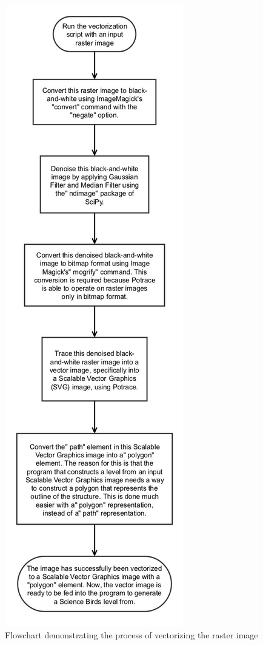 \documentclass{dalthesis}
\begin{document}
\begin{figure}[H]
  \centering
	\caption{Flowchart demonstrating the process of vectorizing the raster image}
  \includegraphics[width=\textwidth,height=\textheight,keepaspectratio]{process/science_birds_pcg-raster_to_vector-edited.png}
\end{figure}
\end{document}
